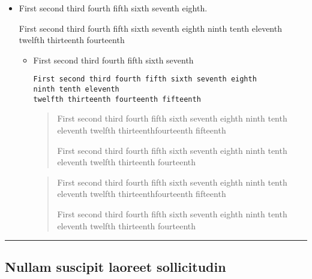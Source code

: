 \documentclass[a4paper]{book}
\begin{document}
\begin{itemize}
\item First second third fourth fifth sixth seventh eighth.

First second third fourth fifth sixth seventh eighth ninth tenth
eleventh twelfth thirteenth fourteenth
  \begin{itemize}
  \item First second third fourth fifth sixth seventh

\begin{verbatim}
First second third fourth fifth sixth seventh eighth
ninth tenth eleventh
twelfth thirteenth fourteenth fifteenth
\end{verbatim}


\begin{quote}
First second third fourth fifth sixth seventh eighth ninth tenth
eleventh twelfth thirteenthfourteenth fifteenth

First second third fourth fifth sixth seventh eighth ninth tenth
eleventh twelfth thirteenth fourteenth
\end{quote}

\begin{quotation}
First second third fourth fifth sixth seventh eighth ninth tenth
eleventh twelfth thirteenthfourteenth fifteenth

First second third fourth fifth sixth seventh eighth ninth tenth
eleventh twelfth thirteenth fourteenth
\end{quotation}

\end{itemize}
\end{itemize}

\hrule

\newpage

\subsection{Nullam suscipit laoreet sollicitudin}
\end{document}
